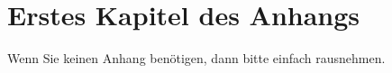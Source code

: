 \chapter{Erstes Kapitel des Anhangs}
\label{a:somelabel}
Wenn Sie keinen Anhang benötigen, dann bitte einfach rausnehmen.

